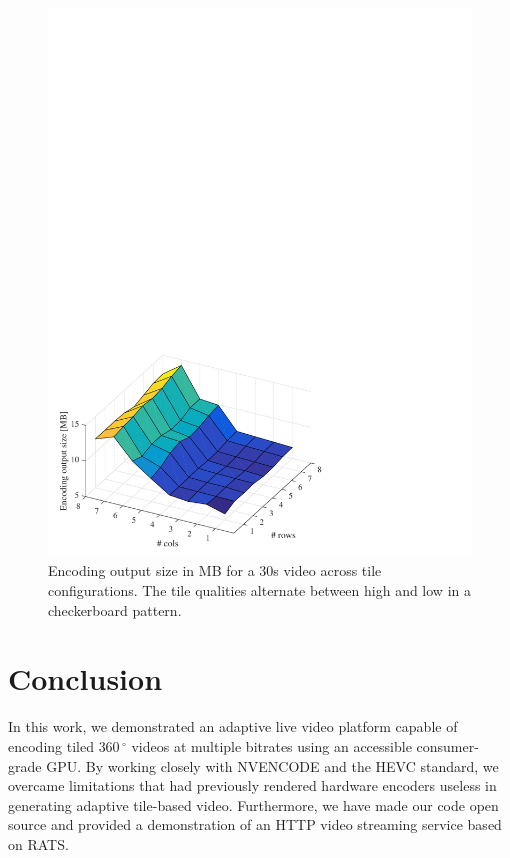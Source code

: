 \begin{figure}[t]
	\includegraphics[width=\columnwidth]{figures/sizes_v1.pdf}
	\caption{Encoding output size in MB for a 30s video across tile configurations. The tile qualities alternate between high and low in a checkerboard pattern. }
	\label{fig:size}
\end{figure}

\section{Conclusion} \label{concl}

In this work, we demonstrated an adaptive live video platform capable of encoding tiled $360\,^{\circ}$ videos at multiple bitrates using an accessible consumer-grade GPU. By working closely with NVENCODE and the HEVC standard, we overcame limitations that had previously rendered hardware encoders useless in generating adaptive tile-based video. Furthermore, we have made our code open source and provided a demonstration of an HTTP video streaming service based on RATS.

